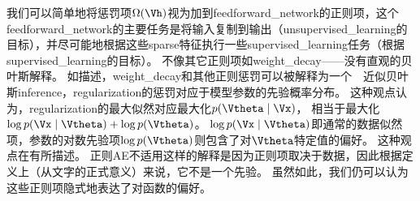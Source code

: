 我们可以简单地将惩罚项$\Omega(\Vh)$视为加到\gls{feedforward_network}的正则项，这个\gls{feedforward_network}的主要任务是将输入复制到输出（\gls{unsupervised_learning}的目标），并尽可能地根据这些\gls{sparse}特征执行一些\gls{supervised_learning}任务（根据\gls{supervised_learning}的目标）。
不像其它正则项如\gls{weight_decay}——没有直观的贝叶斯解释。
如描述，\gls{weight_decay}和其他正则惩罚可以被解释为一个~~近似贝叶斯\gls{inference}，\gls{regularization}的惩罚对应于模型参数的先验概率分布。
这种观点认为，\gls{regularization}的最大似然对应最大化$p(\Vtheta \mid \Vx)$， 相当于最大化$\log p(\Vx \mid \Vtheta) + \log p(\Vtheta)$。 $\log p(\Vx \mid \Vtheta)$即通常的数据似然项，参数的对数先验项$\log p(\Vtheta)$则包含了对$\Vtheta$特定值的偏好。
这种观点在有所描述。
正则\gls{AE}不适用这样的解释是因为正则项取决于数据，因此根据定义上（从文字的正式意义）来说，它不是一个先验。
虽然如此，我们仍可以认为这些正则项隐式地表达了对函数的偏好。


